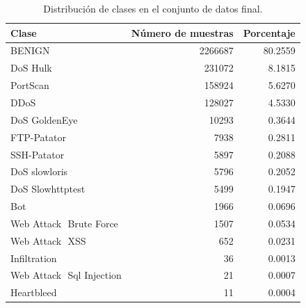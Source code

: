\begin{table}
\caption{Distribución de clases en el conjunto de datos final.}
\label{tab:distribucion_clases}
\begin{tabular}{lrr}
\toprule
Clase & Número de muestras & Porcentaje \\
\midrule
BENIGN & 2266687 & 80.2559 \\
DoS Hulk & 231072 & 8.1815 \\
PortScan & 158924 & 5.6270 \\
DDoS & 128027 & 4.5330 \\
DoS GoldenEye & 10293 & 0.3644 \\
FTP-Patator & 7938 & 0.2811 \\
SSH-Patator & 5897 & 0.2088 \\
DoS slowloris & 5796 & 0.2052 \\
DoS Slowhttptest & 5499 & 0.1947 \\
Bot & 1966 & 0.0696 \\
Web Attack  Brute Force & 1507 & 0.0534 \\
Web Attack  XSS & 652 & 0.0231 \\
Infiltration & 36 & 0.0013 \\
Web Attack  Sql Injection & 21 & 0.0007 \\
Heartbleed & 11 & 0.0004 \\
\bottomrule
\end{tabular}
\end{table}
